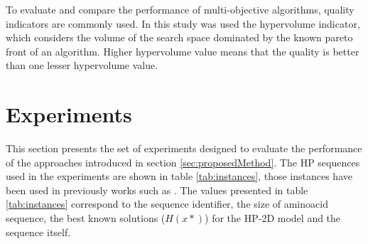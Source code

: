 To evaluate and compare the performance of multi-objective algorithms, quality indicators are commonly used. In this study was used the hypervolume indicator, which considers the volume of the search space dominated by the known pareto front \cite{zitzler2003performance} of an algorithm. Higher hypervolume value means that the quality is better than one lesser hypervolume value.

\section{Experiments}

This section presents the set of experiments designed to evaluate the performance of the approaches introduced in section \ref{sec:proposedMethod}. The HP sequences used in the experiments are shown in table \ref{tab:instances}, those instances have been used in previously works such as \cite{bastolla1997testing,shmygelska2002ant,unger1993genetic,cotta2003protein, santana2004protein,shmygelska2003improved,lesh2003complete}. The values presented in table \ref{tab:instances} correspond to the sequence identifier, the size of aminoacid sequence, the best known solutions ($H(x*)$) for the HP-2D model and the sequence itself. 

